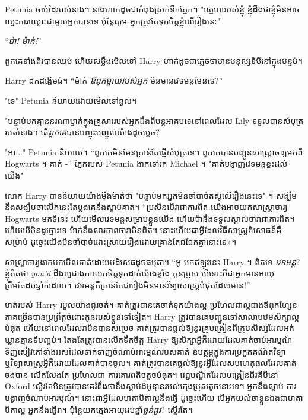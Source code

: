 Petunia ចាប់ដៃរបស់នាង។ នាងហាក់ដូចជាកំពុងស្រក់ទឹកភ្នែក។ "ស្នេហារបស់ខ្ញុំ ខ្ញុំដឹងថាខ្ញុំមិនអាចឈ្នះការឈ្លោះជាមួយអ្នកបានទេ ប៉ុន្តែសូម អ្នកត្រូវតែទុកចិត្តខ្ញុំលើរឿងនេះ"

“\emph{ប៉ា! ម៉ាក់!}”

ពួកគេទាំងពីរបានឈប់ ហើយសម្លឹងមើលទៅ Harry ហាក់ដូចជាភ្លេចថាមានមនុស្សទីបីនៅក្នុងបន្ទប់។

Harry ដកដង្ហើមធំ។ “ម៉ាក់ \emph{ឪពុកម្តាយរបស់អ្នក} មិនមានវេទមន្តមែនទេ?”

"ទេ" Petunia និយាយដោយមើលទៅឆ្ងល់។

"បន្ទាប់មកគ្មាននរណាម្នាក់ក្នុងគ្រួសាររបស់អ្នកដឹងពីមន្តអាគមទេនៅពេលដែល Lily ទទួលបានសំបុត្ររបស់នាង។ តើ\emph{ពួកគេ}បានបញ្ចុះបញ្ចូលយ៉ាងដូចម្តេច?

"អា..." Petunia និយាយ។ “ពួកគេមិនមែនគ្រាន់តែផ្ញើសំបុត្រទេ។ ពួកគេបានបញ្ជូនសាស្រ្តាចារ្យមកពី Hogwarts ។ គាត់ -” ភ្នែករបស់ Petunia ងាកទៅរក Michael ។ "គាត់បង្ហាញវេទមន្តខ្លះដល់យើង"

លោក Harry បាននិយាយយ៉ាងម៉ឺងម៉ាត់ថា "បន្ទាប់មកអ្នកមិនចាំបាច់តស៊ូលើរឿងនេះទេ" ។ សង្ឃឹម​នឹង​សង្ឃឹម​ថា​លើក​នេះ​តែ​ម្តង​គេ​នឹង​ស្តាប់​គាត់។ “ប្រសិនបើវាជាការពិត យើងអាចយកសាស្រ្តាចារ្យ Hogwarts មកទីនេះ ហើយមើលវេទមន្តសម្រាប់ខ្លួនយើង ហើយប៉ានឹងទទួលស្គាល់ថាវាជាការពិត។ ហើយ​បើ​មិន​ដូច្នោះ​ទេ ម៉ាក់​នឹង​សារភាព​ថា​វា​មិន​ពិត។ នោះ​ហើយ​ជា​អ្វី​ដែល​វិធីសាស្ត្រ​ពិសោធន៍​គឺ​សម្រាប់ ដូច្នេះ​យើង​មិន​ចាំបាច់​ដោះស្រាយ​រឿង​ដោយ​គ្រាន់​តែ​ជជែក​គ្នា​នោះ​ទេ»។

សាស្ត្រាចារ្យ​ងាក​មក​មើល​គាត់​ដោយ​បដិសេធ​ដូច​ធម្មតា។ “អូ មកឥឡូវនេះ Harry ។ ពិតទេ \emph{វេទមន្ត}? ខ្ញុំគិតថា \emph{you'd} ដឹងល្អជាងការយកចិត្តទុកដាក់យ៉ាងខ្លាំង កូនប្រុស បើទោះបីជាអ្នកមានអាយុត្រឹមតែដប់ឆ្នាំក៏ដោយ។ វេទមន្ត​គឺ​គ្រាន់​តែ​ជា​រឿង​មិន​មាន​វិទ្យា​សា​ស្រ្ត​បំផុត​ដែល​មាន​!”

មាត់របស់ Harry រមួលយ៉ាងជូរចត់។ គាត់​ត្រូវ​បាន​គេ​ចាត់​ទុក​យ៉ាង​ល្អ ប្រហែល​ជា​ល្អ​ជាង​ឪពុក​ហ្សែន​ភាគ​ច្រើន​បាន​ប្រព្រឹត្ត​ចំពោះ​កូន​របស់​ខ្លួន​ទៅ​ទៀត។ Harry ត្រូវ​បាន​គេ​បញ្ជូន​ទៅ​សាលា​បឋម​សិក្សា​ល្អ​បំផុត ហើយ​នៅ​ពេល​ដែល​វា​មិន​បាន​សម្រេច គាត់​ត្រូវ​បាន​ផ្តល់​ឱ្យ​នូវ​គ្រូ​បង្រៀន​ពី​ក្រុម​សិស្ស​ដែល​អត់​ឃ្លាន​គ្មាន​ទី​បញ្ចប់។ តែងតែត្រូវបានលើកទឹកចិត្ត Harry ឱ្យសិក្សាអ្វីក៏ដោយដែលគាត់ចាប់អារម្មណ៍ ទិញសៀវភៅទាំងអស់ដែលទាក់ទាញចំណាប់អារម្មណ៍របស់គាត់ ឧបត្ថម្ភក្នុងការប្រកួតគណិតវិទ្យា ឬវិទ្យាសាស្ត្រអ្វីក៏ដោយដែលគាត់បានចូល។ គាត់ត្រូវបានគេផ្តល់ឱ្យនូវអ្វីដែលសមហេតុផលដែលគាត់ចង់បាន លើកលែងតែ ប្រហែលជា ការគោរពតិចតួចបំផុត។ វេជ្ជបណ្ឌិតដែលបង្រៀនជីវគីមីនៅ Oxford ស្ទើរតែមិនត្រូវបានគេរំពឹងថានឹងស្តាប់ដំបូន្មានរបស់ក្មេងប្រុសតូចនោះទេ។ អ្នកនឹងស្តាប់ ការបង្ហាញចំណាប់អារម្មណ៍។ នោះ​ជា​អ្វី​ដែល​មាតាបិតា​ល្អ​នឹង​ធ្វើ ដូច្នេះ​ហើយ បើ​អ្នក​យល់​ថា​ខ្លួន​ឯង​ជា​មាតាបិតា​ល្អ អ្នក​នឹង​ធ្វើ​វា​។ ប៉ុន្តែយកក្មេងអាយុដប់ឆ្នាំ\emph{ធ្ងន់ធ្ងរ}? ស្ទើរតែ។

